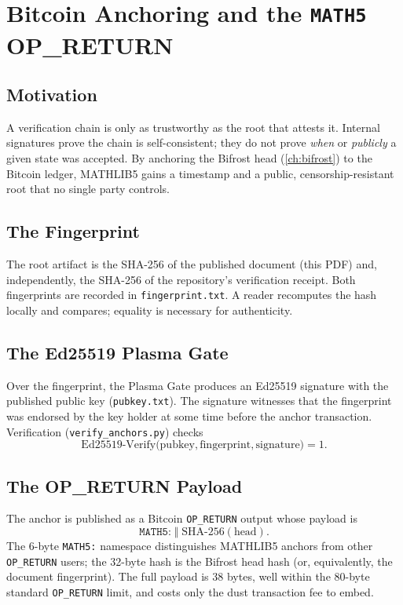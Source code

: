 \chapter{Bitcoin Anchoring and the \texttt{MATH5} OP\_RETURN}
\label{ch:anchors}

\section{Motivation}
\label{sec:anc-mot}

A verification chain is only as trustworthy as the root that attests it.
Internal signatures prove the chain is self-consistent; they do not prove
\emph{when} or \emph{publicly} a given state was accepted. By anchoring
the Bifrost head (\cref{ch:bifrost}) to the Bitcoin ledger, MATHLIB5
gains a timestamp and a public, censorship-resistant root that no single
party controls.

\section{The Fingerprint}
\label{sec:anc-fp}

The root artifact is the SHA-256 of the published document (this PDF) and,
independently, the SHA-256 of the repository's verification receipt. Both
fingerprints are recorded in \texttt{fingerprint.txt}. A reader recomputes
the hash locally and compares; equality is necessary for authenticity.

\section{The Ed25519 Plasma Gate}
\label{sec:anc-ed}

Over the fingerprint, the Plasma Gate produces an Ed25519 signature with
the published public key (\texttt{pubkey.txt}). The signature witnesses
that the fingerprint was endorsed by the key holder at some time before
the anchor transaction. Verification (\texttt{verify\_anchors.py}) checks
\[
\text{Ed25519-Verify}\bigl(\text{pubkey}, \text{fingerprint},
\text{signature}\bigr) = 1.
\]

\section{The OP\_RETURN Payload}
\label{sec:anc-op}

The anchor is published as a Bitcoin \texttt{OP\_RETURN} output whose
payload is
\[
\texttt{MATH5:}\;\Vert\;\text{SHA-256}(\text{head}).
\]
The 6-byte \texttt{MATH5:} namespace distinguishes MATHLIB5 anchors from
other \texttt{OP\_RETURN} users; the 32-byte hash is the Bifrost head hash
(or, equivalently, the document fingerprint). The full payload is 38 bytes,
well within the 80-byte standard \texttt{OP\_RETURN} limit, and costs only
the dust transaction fee to embed.

